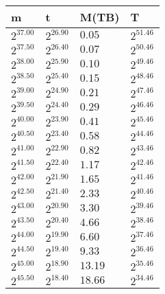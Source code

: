 \begin{tabular}{llll}
m & t & M(TB) & T \\ \hline
$2^{37.00}$ & $2^{26.90}$ & $0.05$ & $2^{51.46}$ \\
$2^{37.50}$ & $2^{26.40}$ & $0.07$ & $2^{50.46}$ \\
$2^{38.00}$ & $2^{25.90}$ & $0.10$ & $2^{49.46}$ \\
$2^{38.50}$ & $2^{25.40}$ & $0.15$ & $2^{48.46}$ \\
$2^{39.00}$ & $2^{24.90}$ & $0.21$ & $2^{47.46}$ \\
$2^{39.50}$ & $2^{24.40}$ & $0.29$ & $2^{46.46}$ \\
$2^{40.00}$ & $2^{23.90}$ & $0.41$ & $2^{45.46}$ \\
$2^{40.50}$ & $2^{23.40}$ & $0.58$ & $2^{44.46}$ \\
$2^{41.00}$ & $2^{22.90}$ & $0.82$ & $2^{43.46}$ \\
$2^{41.50}$ & $2^{22.40}$ & $1.17$ & $2^{42.46}$ \\
$2^{42.00}$ & $2^{21.90}$ & $1.65$ & $2^{41.46}$ \\
$2^{42.50}$ & $2^{21.40}$ & $2.33$ & $2^{40.46}$ \\
$2^{43.00}$ & $2^{20.90}$ & $3.30$ & $2^{39.46}$ \\
$2^{43.50}$ & $2^{20.40}$ & $4.66$ & $2^{38.46}$ \\
$2^{44.00}$ & $2^{19.90}$ & $6.60$ & $2^{37.46}$ \\
$2^{44.50}$ & $2^{19.40}$ & $9.33$ & $2^{36.46}$ \\
$2^{45.00}$ & $2^{18.90}$ & $13.19$ & $2^{35.46}$ \\
$2^{45.50}$ & $2^{18.40}$ & $18.66$ & $2^{34.46}$ \\
\end{tabular}

